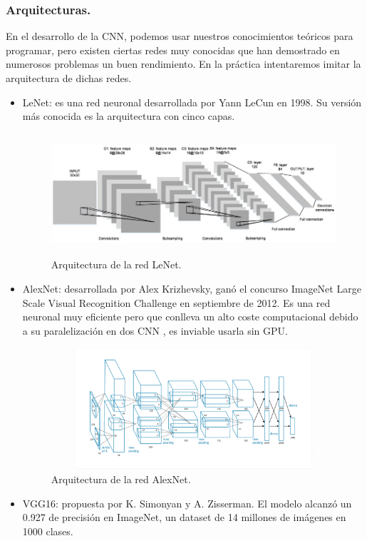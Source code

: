 \documentclass[a4paper,11pt]{article}
\begin{document}
\subsubsection{Arquitecturas.}
En el desarrollo de la CNN, podemos usar nuestros conocimientos teóricos para programar, pero existen ciertas redes muy conocidas que han demostrado en numerosos problemas un buen rendimiento. En la práctica intentaremos imitar la arquitectura de dichas redes.
\begin{itemize}
\item LeNet: es una red neuronal desarrollada por Yann LeCun en 1998. Su versión más conocida es la arquitectura con cinco capas. \begin{figure}[H]
\centering
\includegraphics[width=14.0cm, height=4.5cm]{lenet5.png}
\caption{Arquitectura de la red LeNet.}
\end{figure}
\item AlexNet: desarrollada por Alex Krizhevsky, ganó el concurso ImageNet Large Scale Visual Recognition Challenge en septiembre de 2012. Es una red neuronal muy eficiente pero que conlleva un alto coste computacional debido a su paralelización en dos CNN , es inviable usarla sin GPU.\begin{figure}[H]
\centering
\includegraphics[width=14.0cm, height=4.5cm]{AlexNet2012.png}
\caption{Arquitectura de la red AlexNet.}
\end{figure}
\item VGG16: propuesta por K. Simonyan y A. Zisserman. El modelo alcanzó un 0.927 de precisión en ImageNet, un dataset de 14 millones de imágenes en 1000 clases. \begin{figure}[H]

\end{figure}
\end{itemize}
\end{document}
